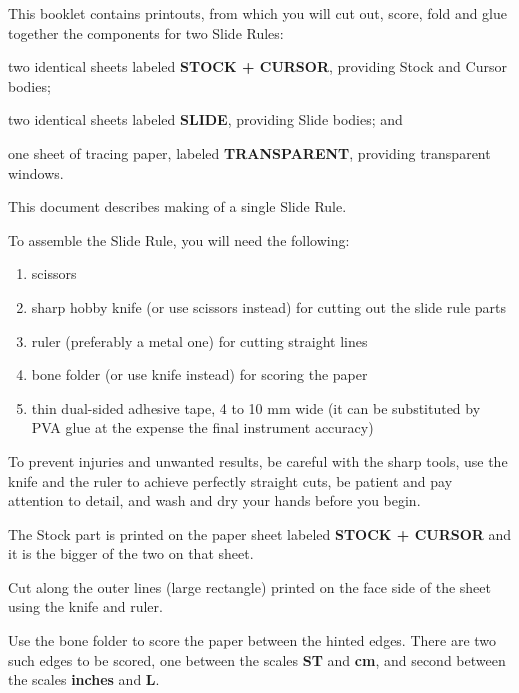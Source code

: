   \begin{multicols*}{3}
\footnotesize  This booklet contains printouts, from which you will cut out, score, fold and glue together the components for two Slide Rules:
    \begin{inparaenum}
      \item two identical sheets labeled \textbf{STOCK + CURSOR}, providing Stock and Cursor bodies;
      \item two identical sheets labeled \textbf{SLIDE}, providing Slide bodies; and
      \item one sheet of tracing paper, labeled \textbf{TRANSPARENT}, providing transparent windows.
    \end{inparaenum}

  This document describes making of a single Slide Rule.

  \normalsize{To assemble the Slide Rule, you will need the following:
    \begin{enumerate}
      \setlength{\parskip}{0pt}
      \setlength{\parsep}{0pt}
      \item scissors
      \item sharp hobby knife (or use scissors instead) for cutting out the slide rule parts
      \item ruler (preferably a metal one) for cutting straight lines
      \item bone folder (or use knife instead) for scoring the paper
      \item thin dual-sided adhesive tape, 4 to 10 mm wide (it can be substituted by PVA glue at the expense the final instrument accuracy)
    \end{enumerate}

  To prevent injuries and unwanted results,
      be careful with the sharp tools,
      use the knife and the ruler to achieve perfectly straight cuts,
      be patient and pay attention to detail, and
      wash and dry your hands before you begin.


\footnotesize The Stock part is printed on the paper sheet labeled \textbf{STOCK + CURSOR} and it is the bigger of the two on that sheet.\normalsize

Cut along the outer lines (large rectangle) printed on the face side of the sheet using the knife and ruler.

Use the bone folder to score the paper between the hinted edges. There are two such edges to be scored, one between the scales \textbf{ST} and \textbf{cm}, and second between the scales \textbf{inches} and \textbf{L}.

}
\end{multicols*}
